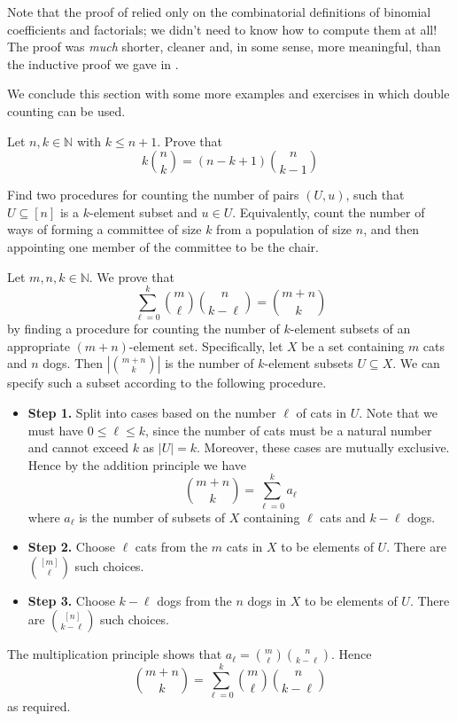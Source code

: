 Note that the proof of  relied only on the combinatorial definitions of binomial coefficients and factorials; we didn't need to know how to compute them at all! The proof was \textit{much} shorter, cleaner and, in some sense, more meaningful, than the inductive proof we gave in .

We conclude this section with some more examples and exercises in which
double counting
can be used.

\begin{exercise}
\label{exCountingKTimesNChooseK}
Let $n,k \in \mathbb{N}$ with $k \le n+1$. Prove that
\[ k \binom{n}{k} = (n-k+1) \binom{n}{k-1} \]
\begin{backhint}
Find two procedures for counting the number of pairs $(U, u)$, such that $U \subseteq [n]$ is a $k$-element subset and $u \in U$. Equivalently, count the number of ways of forming a committee of size $k$ from a population of size $n$, and then appointing one member of the committee to be the chair.
\end{backhint}
\end{exercise}

\begin{example}
\label{exCombinatorialIdentityCatsAndDogs}
Let $m,n,k \in \mathbb{N}$. We prove that
\[ \sum_{\ell=0}^k \binom{m}{\ell} \binom{n}{k-\ell} = \binom{m+n}{k} \]
by finding a procedure for counting the number of $k$-element subsets of an appropriate $(m+n)$-element set. Specifically, let $X$ be a set containing $m$ cats and $n$ dogs. Then $\left| \binom{m+n}{k} \right|$ is the number of $k$-element subsets $U \subseteq X$. We can specify such a subset according to the following procedure.
\begin{itemize}
\item \textbf{Step 1.} Split into cases based on the number $\ell$ of cats in $U$. Note that we must have $0 \le \ell \le k$, since the number of cats must be a natural number and cannot exceed $k$ as $|U|=k$. Moreover, these cases are mutually exclusive. Hence by the addition principle we have
\[ \binom{m+n}{k} = \sum_{\ell=0}^k a_{\ell} \]
where $a_{\ell}$ is the number of subsets of $X$ containing $\ell$ cats and $k-\ell$ dogs.
\item \textbf{Step 2.} Choose $\ell$ cats from the $m$ cats in $X$ to be elements of $U$. There are $\binom{[m]}{\ell}$ such choices.
\item \textbf{Step 3.} Choose $k-\ell$ dogs from the $n$ dogs in $X$ to be elements of $U$. There are $\binom{[n]}{k-\ell}$ such choices.
\end{itemize}
The multiplication principle shows that $a_{\ell} = \binom{m}{\ell} \binom{n}{k-\ell}$. Hence
\[ \binom{m+n}{k} = \sum_{\ell=0}^k \binom{m}{\ell} \binom{n}{k-\ell} \]
as required.
\end{example}

